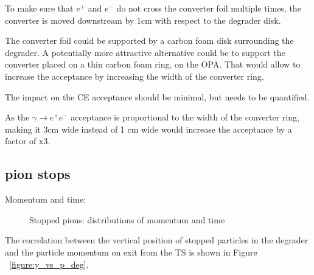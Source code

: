 To make sure that $e^+$ and $e^-$ do not cross the converter foil multiple times,
the converter is moved downstream by 1cm with respect to the degrader disk.

The converter foil could be supported by a carbon foam disk surrounding the degrader.
A potentially more attractive alternative could be to support the converter placed
on a thin carbon foam ring, on the OPA. That would allow to increase the acceptance
by increasing the width of the converter ring.

{\red The impact on the CE acceptance should be minimal, but needs to be quantified.}

As the $\gamma \to e^+e^-$ acceptance is proportional to the width of the converter ring,
making it 3cm wide instead of 1 cm wide would increase the acceptance by a factor of x3.

\subsection{pion stops}

Momentum and time:

\begin{figure}[H]
  \caption{
    \label{figure:sum_mom_vd13}
    Stopped pions: distributions of momentum and time
  }
\end{figure}


The correlation between the vertical position of stopped particles in the degrader and the particle momentum
on exit from the TS is shown in Figure ~\ref{figure:y_vs_p_deg}.

